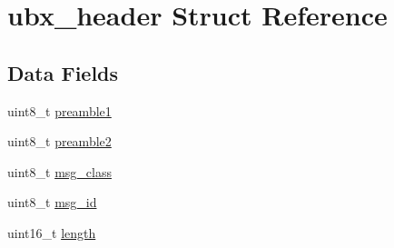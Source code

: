 \hypertarget{structubx__header}{\section{ubx\+\_\+header Struct Reference}
\label{structubx__header}
}
\subsection*{Data Fields}
\begin{DoxyCompactItemize}
\item 
uint8\+\_\+t \hyperlink{structubx__header_ae5d4d18b7e5a9c65734488ad41e5815e}{preamble1}
\item 
uint8\+\_\+t \hyperlink{structubx__header_a0b4e94fa8468acc5fc27bc28e406f7b8}{preamble2}
\item 
uint8\+\_\+t \hyperlink{structubx__header_a8f7852ae57f29adf7a026891f7243802}{msg\+\_\+class}
\item 
uint8\+\_\+t \hyperlink{structubx__header_a31aabe5f27b936dbd81f0669ce5a5ac9}{msg\+\_\+id}
\item 
uint16\+\_\+t \hyperlink{structubx__header_af8a66cd98aee0b2b762852011942756f}{length}
\end{DoxyCompactItemize}


